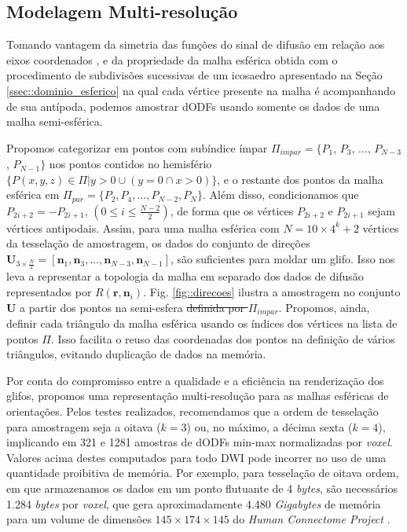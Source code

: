 \subsection{Modelagem Multi-resolução}
\label{ssec:modelagem_multiresolucao}

Tomando vantagem da simetria das funções do sinal de difusão em relação aos eixos coordenados \cite{descoteaux2015}, e da propriedade da malha esférica obtida com o procedimento de subdivisões sucessivas de um icosaedro apresentado na Seção \ref{ssec::dominio_esferico} na qual cada vértice presente na malha é acompanhando de sua antípoda, podemos amostrar dODFs usando somente os dados de uma malha semi-esférica.

Propomos categorizar em pontos com subíndice ímpar $\Pi_{impar} = \{P_1$,
$P_3$, ...,
$P_{N-3}$,
$P_{N-1}\}$ nos pontos contidos no hemisfério $\{P(x, y, z) \in \Pi | y > 0 \cup (y = 0 \cap x > 0)\}$, e o restante dos pontos da malha esférica em $\Pi_{par} = \{P_2, P_4, ..., P_{N-2}, P_{N}\}$. Além disso, condicionamos que $P_{2i+2} = -P_{2i+1}$, $(0 \leq i \leq \frac{N-2}{2})$, de forma que os vértices $P_{2i+2}$ e $P_{2i+1}$ sejam vértices antipodais. Assim, para uma malha esférica com $N = 10 \times 4^k + 2$ vértices da tesselação de amostragem, os dados do conjunto de direções $\mathbf{U}_{3\times \frac{N}{2}} = [
\mathbf{n}_1,
\mathbf{n}_3, ..., 
\mathbf{n}_{N-3},
\mathbf{n}_{N-1}
]$, são suficientes para moldar um glifo. Isso nos leva a representar a topologia da malha em separado dos dados de difusão representados por $R(\mathbf{r},\mathbf{n}_i)$. Fig. \ref{fig::direcoes} ilustra a amostragem no conjunto $\mathbf{U}$ a partir dos pontos na semi-esfera\sout{ definida por $\Pi_{impar}$}. Propomos, ainda, definir cada triângulo da malha esférica usando os índices dos vértices na lista de pontos $\Pi$. Isso facilita o reuso das coordenadas dos pontos na definição de vários triângulos, evitando duplicação de dados na memória. 

Por conta do compromisso entre a qualidade e a eficiência na renderização dos glifos, propomos uma representação multi-resolução para as malhas esféricas de orientações. Pelos testes realizados, recomendamos que a ordem de tesselação para amostragem seja a oitava ($k=3$) ou, no máximo, a décima sexta ($k=4$), implicando em 321 e 1281 amostras de dODFs min-max normalizadas por \textit{voxel}. Valores acima destes computados para todo DWI pode incorrer no uso de uma quantidade proibitiva de memória. Por exemplo, para tesselação de oitava ordem, em que armazenamos os dados em um ponto flutuante de 4 \textit{bytes}, são necessários 1.284 \textit{bytes} por \textit{voxel}, que gera aproximadamente 4.480 \textit{Gigabytes} de memória para um volume de dimensões $145 \times 174 \times 145$ do \textit{Human Connectome Project} \cite{essen2012}.


